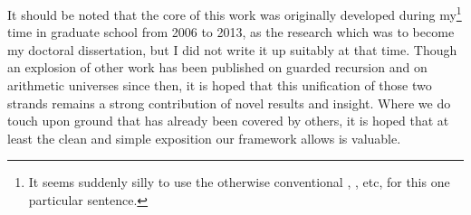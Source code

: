 It should be noted that the core of this work was originally developed during my\footnote{It seems suddenly silly to use the otherwise conventional , , etc, for this one particular sentence.} time in graduate school from 2006 to 2013, as the research which was to become my doctoral dissertation, but I did not write it up suitably at that time. Though an explosion of other work has been published on guarded recursion and on arithmetic universes since then, it is hoped that this unification of those two strands remains a strong contribution of novel results and insight. Where we do touch upon ground that has already been covered by others, it is hoped that at least the clean and simple exposition our framework allows is valuable.

\fileend